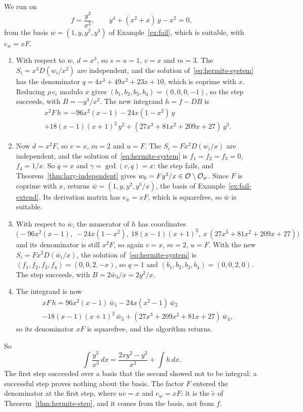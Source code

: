 \begin{example}\label{ex:lazy-full}
We run  on
\[
  f = \frac{y^3}{x^3}, \qquad y^4 + (x^2 + x)\, y - x^2 = 0 ,
\]
from the basis $w = (1, y, y^2, y^3)$ of Example~\ref{ex:fail}, which is
suitable, with $e_w = x F$.
\begin{enumerate}
\item With respect to $w$, $d = x^3$, so $s = u = 1$, $v = x$ and $m = 3$. The
  $S_i = x^3 D(w_i / x^2)$ are independent, and the solution
  of~\eqref{eq:hermite-system} has the denominator $q = 4x^3 + 49x^2 + 23x +
  10$, which is coprime with $x$. Reducing $\rho\, c_i$ modulo $x$ gives $(b_1,
  b_2, b_3, b_4) = (0, 0, 0, -1)$, so the step succeeds, with $B = -y^3/x^2$.
  The new integrand $h = f - DB$ is
  \begin{multline*}
    x^2 F\, h = -96 x^2 (x - 1) - 24 x (1 - x^2)\, y \\
              + 18 (x - 1)(x + 1)^2\, y^2
              + (27 x^3 + 81 x^2 + 209 x + 27)\, y^3 .
  \end{multline*}
\item Now $d = x^2 F$, so $v = x$, $m = 2$ and $u = F$. The $S_i = F x^2 D(w_i
  / x)$ are independent, and the solution of~\eqref{eq:hermite-system} is $f_1
  = f_2 = f_3 = 0$, $f_4 = 1/x$. So $q = x$ and $\gamma = \gcd(v, q) = x$: the
  step fails, and Theorem~\ref{thm:lazy-independent} gives $w_0 = F y^3 / x \in
  \mathcal{O} \setminus \mathcal{O}_w$. Since $F$ is coprime with $x$,
   returns $\bar w = (1, y, y^2, y^3/x)$, the basis of
  Example~\ref{ex:fail-extend}. Its derivation matrix has $e_{\bar w} = x F$,
  which is squarefree, so $\bar w$ is suitable.
\item With respect to $\bar w$, the numerator of $h$ has coordinates
  \[
    \bigl( -96 x^2 (x - 1),\ -24 x (1 - x^2),\ 18 (x - 1)(x + 1)^2,\
           x\, (27 x^3 + 81 x^2 + 209 x + 27) \bigr)
  \]
  and its denominator is still $x^2 F$, so again $v = x$, $m = 2$, $u = F$.
  With the new $S_i = F x^2 D(\bar w_i / x)$, the solution
  of~\eqref{eq:hermite-system} is $(f_1, f_2, f_3, f_4) = (0, 0, 2, -x)$, so
  $q = 1$ and $(b_1, b_2, b_3, b_4) = (0, 0, 2, 0)$. The step succeeds, with
  $B = 2 \bar w_3 / x = 2 y^2 / x$.
\item The integrand is now
  \begin{multline*}
    x F\, h = 96 x^2 (x - 1)\, \bar w_1 - 24 x (x^2 - 1)\, \bar w_2 \\
              - 18 (x - 1)(x + 1)^2\, \bar w_3
              + (27 x^3 + 209 x^2 + 81 x + 27)\, \bar w_4 ,
  \end{multline*}
  so its denominator $x F$ is squarefree, and the algorithm returns.
\end{enumerate}
So
\[
  \int \frac{y^3}{x^3}\, dx = \frac{2 x y^2 - y^3}{x^2} + \int h\, dx .
\]
The first step succeeded over a basis that the second showed not to be
integral: a successful step proves nothing about the basis. The factor $F$
entered the denominator at the first step, where $u v = x$ and $e_w = x F$:
it is the $\tilde e$ of Theorem~\ref{thm:hermite-step}, and it comes from the
basis, not from $f$.
\end{example}

